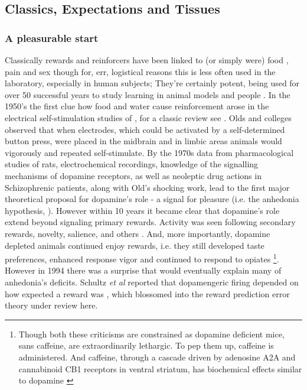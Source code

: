 \documentclass[doc,12pt]{apa}        %
\begin{document}
\subsection{Classics, Expectations and Tissues} %
\label{sub:c_and_e}
\subsubsection{A pleasurable start} %
Classically rewards and reinforcers have been linked to (or simply were) food \cite{ODoherty:2006p2875}, pain \cite{Becerra:2011p7581,schultz:2007aa} and sex though for, err, logistical reasons this is less often used in the laboratory, especially in human subjects; They're certainly potent, being used for over 50 successful years to study learning in animal models \cite{iversen:2007aa} and people \cite{Kim:2010p7248,Montague:2006mz}.  In the 1950's the first clue how food and water cause reinforcement arose in the electrical self-stimulation studies of , for a classic review see .  Olds and colleges observed that when electrodes, which could be activated by a self-determined button press, were placed in the midbrain and in limbic areas animals would vigorously and repeated self-stimulate.  By the 1970s data from pharmacological studies of rats, electrochemical recordings, knowledge of the signalling mechanisms of dopamine receptors, as well as neoleptic drug actions in Schizophrenic patients, along with Old's shocking work, lead to the first major theoretical proposal for dopamine's role - a signal for pleasure (i.e. the anhedonia hypothesis, ).  However within 10 years it became clear that dopamine's role extend beyond signaling primary rewards. Activity was seen following secondary rewards, novelty, salience, and others \cite{Spanagel:1999p8515, Salamone:2005p8774, BrombergMartin:2010p8834}.  And, more importantly, dopamine depleted animals continued enjoy rewards, i.e. they still developed taste preferences, enhanced response vigor \cite{Cannon:2003p8513} and continued to respond to opiates \cite{Hnasko:2005p8832}
\footnote{
Though both these criticisms are constrained as dopamine deficient mice, sans caffeine, are extraordinarily lethargic. To pep them up, caffeine is administered.  And caffeine, through a cascade driven by adenosine A2A and cannabinoid CB1 receptors in ventral striatum, has biochemical effects similar to dopamine \cite{Lazarus:2011p8137, Rossi:2010p7252}
}.  
  However in 1994 there was a surprise that would eventually explain many of anhedonia's deficits.  Schultz \emph{et al} reported that dopamengeric firing depended on how expected a reward was \cite{Mirenowicz:1994p7185}, which blossomed into the reward prediction error theory under review here.
\end{document}
